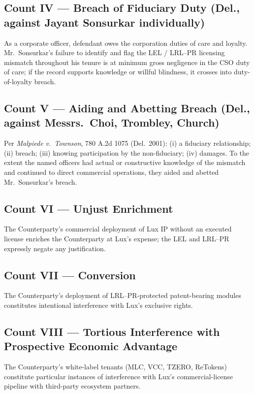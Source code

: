 \documentclass[11pt,letterpaper]{article}
\begin{document}
\subsection*{Count IV --- Breach of Fiduciary Duty (Del., against Jayant Sonsurkar individually)}

As a corporate officer, defendant owes the corporation duties of
care and loyalty. Mr.\ Sonsurkar's failure to identify and flag the
LEL / LRL--PR licensing mismatch throughout his tenure is at minimum
gross negligence in the CSO duty of care; if the record supports
knowledge or willful blindness, it crosses into duty-of-loyalty
breach.

\subsection*{Count V --- Aiding and Abetting Breach (Del., against Messrs.\ Choi, Trombley, Church)}

Per \emph{Malpiede v.\ Townson}, 780 A.2d 1075 (Del.\ 2001): (i) a
fiduciary relationship; (ii) breach; (iii) knowing participation by
the non-fiduciary; (iv) damages. To the extent the named officers
had actual or constructive knowledge of the mismatch and continued to
direct commercial operations, they aided and abetted Mr.\ Sonsurkar's
breach.

\subsection*{Count VI --- Unjust Enrichment}

The Counterparty's commercial deployment of Lux IP without an
executed license enriches the Counterparty at Lux's expense; the
LEL and LRL--PR expressly negate any justification.

\subsection*{Count VII --- Conversion}

The Counterparty's deployment of LRL--PR-protected patent-bearing
modules constitutes intentional interference with Lux's exclusive
rights.

\subsection*{Count VIII --- Tortious Interference with Prospective Economic Advantage}

The Counterparty's white-label tenants (MLC, VCC, TZERO, ReTokens)
constitute particular instances of interference with Lux's
commercial-license pipeline with third-party ecosystem partners.
\end{document}
